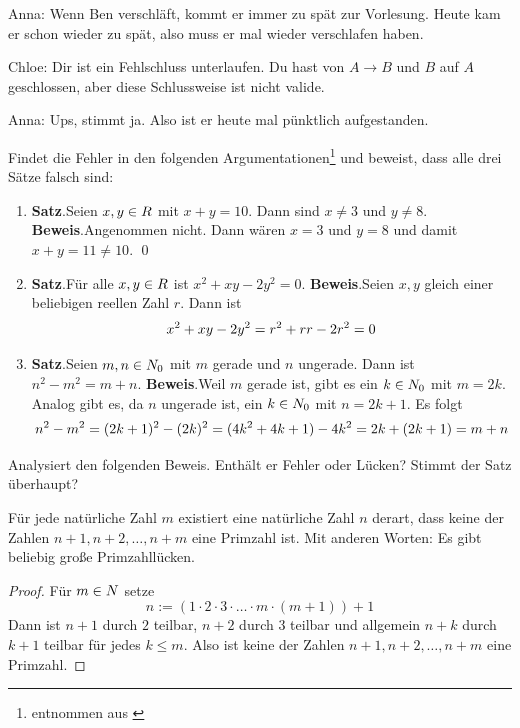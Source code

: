 \begin{aufg}
\begin{enumerate}
\begin{labeling}[font=\scshape]
            \item[Anna:] Wenn Ben verschläft, kommt er immer zu spät zur Vorlesung. Heute kam er schon wieder zu spät, also muss er mal wieder verschlafen haben.
            \item[Chloe:] Dir ist ein Fehlschluss unterlaufen. Du hast von $A\to B$ und $B$ auf $A$ geschlossen, aber diese Schlussweise ist nicht valide.
            \item[Anna:] Ups, stimmt ja. Also ist er heute mal pünktlich aufgestanden.
        \end{labeling}
    \end{enumerate}
\end{aufg}


\begin{aufg}[Fehlersuche I]
    Findet die Fehler in den folgenden Argumentationen\footnote{entnommen aus \cite{Vel06}} und beweist, dass alle drei Sätze falsch sind:
    \begin{enumerate}
        \item {\color{dred}\textbf{Satz}.}\enspace Seien $x,y\in \R$ mit $x+y=10$. Dann sind $x\neq 3$ und $y\neq 8$. \newline
        {\color{gray}\textbf{Beweis}.}\enspace Angenommen nicht. Dann wären $x=3$ und $y=8$ und damit $x+y=11\neq 10$. \qed
        \item {\color{dred}\textbf{Satz}.}\enspace Für alle $x,y\in \R$ ist $x^2+xy-2y^2=0$. \newline
        {\color{gray}\textbf{Beweis}.}\enspace Seien $x,y$ gleich einer beliebigen reellen Zahl $r$. Dann ist
        \[ x^2+xy-2y^2 = r^2+rr - 2r^2=0 \qed\]
        \item {\color{dred}\textbf{Satz}.}\enspace Seien $m,n\in \N_0$ mit $m$ gerade und $n$ ungerade. Dann ist $n^2-m^2=m+n$. \newline
        {\color{gray}\textbf{Beweis}.}\enspace Weil $m$ gerade ist, gibt es ein $k\in \N_0$ mit $m=2k$. Analog gibt es, da $n$ ungerade ist, ein $k\in \N_0$ mit $n=2k+1$. Es folgt
        \[ n^2-m^2 = (2k+1)^2-(2k)^2 = (4k^2+4k+1)-4k^2 = 2k+(2k+1) = m+n \qed \]
    \end{enumerate}
\end{aufg}


\begin{aufg}[Fehlersuche II]
    Analysiert den folgenden Beweis. Enthält er Fehler oder Lücken? Stimmt der Satz überhaupt?
    \begin{satz}
        Für jede natürliche Zahl $m$ existiert eine natürliche Zahl $n$ derart, dass keine der Zahlen $n+1,n+2,\dots , n+m$ eine Primzahl ist. Mit anderen Worten: Es gibt beliebig große Primzahllücken.
    \end{satz}
    \begin{proof}
        Für $m\in \N$ setze
            \[ n:= (1 \cdot 2 \cdot 3 \cdot \ldots \cdot m \cdot(m+1)) +1 \]
        Dann ist $n+1$ durch $2$ teilbar, $n+2$ durch $3$ teilbar und allgemein $n+k$ durch $k+1$ teilbar für jedes $k\le m$. Also ist keine der Zahlen $n+1,n+2,\dots , n+m$ eine Primzahl.
    \end{proof}
\end{aufg}


